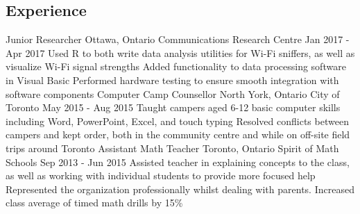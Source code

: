 \documentclass[]{aanguyen_cv}
\begin{document}
	\begin{main}%
		\vspace{35pt}%
		\section{Experience}
			\mainentry%
				{Junior Researcher}%
				{Ottawa, Ontario}%
				{Communications Research Centre}%
				{Jan 2017 - Apr 2017}%
				{\faCaretRight \space Used R to both write data analysis utilities for Wi-Fi sniffers, as well as visualize Wi-Fi signal strengths
				 \faCaretRight \space  \space Added functionality to data processing software in Visual Basic
				 \faCaretRight \space Performed hardware testing to ensure smooth integration with software components}
			\mainentry%
				{Computer Camp Counsellor}%
				{North York, Ontario}%
				{City of Toronto}%
				{May 2015 - Aug 2015}%
				{\faCaretRight \space Taught campers aged 6-12 basic computer skills including Word, PowerPoint, Excel, and touch typing
				\faCaretRight \space Resolved conflicts between campers and kept order, both in the community centre and while on off-site field trips around Toronto}
			\mainentry%
				{Assistant Math Teacher}%
				{Toronto, Ontario}%
				{Spirit of Math Schools}%
				{Sep 2013 - Jun 2015}%
				{\faCaretRight \space Assisted teacher in explaining concepts to the class, as well as working with individual students to provide more focused help
				\faCaretRight \space Represented the organization professionally whilst dealing with parents.
				\faCaretRight \space Increased class average of timed math drills by 15\%}
			\vspace{0.65cm}%

\end{main}
\end{document}
